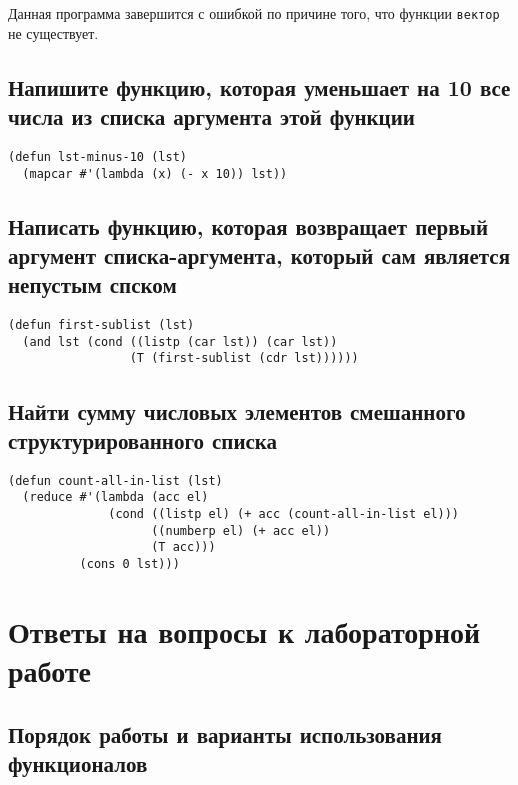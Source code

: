 Данная программа завершится с ошибкой по причине того, что функции \texttt{вектор} не существует.

\section{Напишите функцию, которая уменьшает на 10 все числа из списка аргумента этой функции}

\begin{lstlisting}
(defun lst-minus-10 (lst)
  (mapcar #'(lambda (x) (- x 10)) lst))
\end{lstlisting}

\section{Написать функцию, которая возвращает первый аргумент списка-аргумента, который сам является непустым спском}

\begin{lstlisting}
(defun first-sublist (lst)
  (and lst (cond ((listp (car lst)) (car lst))
                 (T (first-sublist (cdr lst))))))
\end{lstlisting}

\section{Найти сумму числовых элементов смешанного структурированного списка}

\begin{lstlisting}
(defun count-all-in-list (lst)
  (reduce #'(lambda (acc el)
              (cond ((listp el) (+ acc (count-all-in-list el)))
                    ((numberp el) (+ acc el))
                    (T acc)))
          (cons 0 lst)))
\end{lstlisting}

\chapter{Ответы на вопросы к лабораторной работе}

\section{Порядок работы и варианты использования функционалов}

